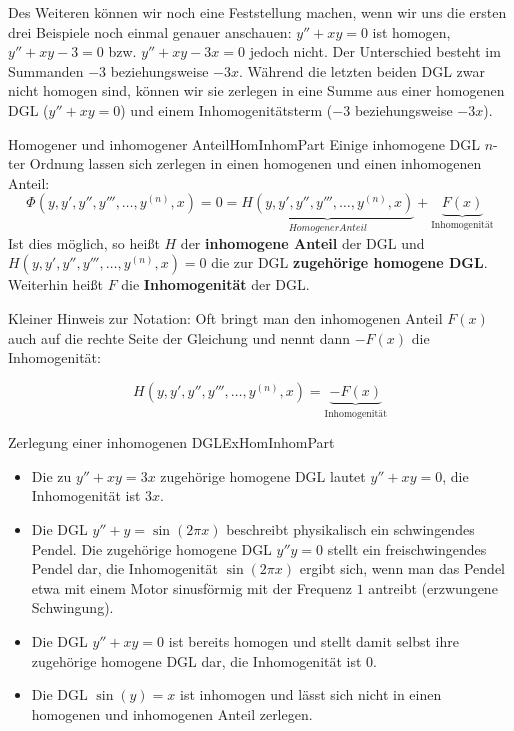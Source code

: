 Des Weiteren können wir noch eine Feststellung machen, wenn wir uns die ersten drei Beispiele noch einmal genauer anschauen: $y''+xy=0$ ist homogen, $y''+xy-3=0$ bzw. $y''+xy-3x=0$ jedoch nicht. Der Unterschied besteht im Summanden $-3$ beziehungsweise $-3x$. Während die letzten beiden DGL zwar nicht homogen sind, können wir sie zerlegen in eine Summe aus einer homogenen DGL ($y''+xy=0$) und einem Inhomogenitätsterm ($-3$ beziehungsweise $-3x$).

\begin{definition}{Homogener und inhomogener Anteil}{HomInhomPart}
    Einige inhomogene DGL $n$-ter Ordnung lassen sich zerlegen in einen homogenen und einen inhomogenen Anteil:
    $$
        \Phi(y,y',y'',y''',\dots,y^{(n)},x) = 0 = \underbrace{H(y,y',y'',y''',\dots,y^{(n)},x)}_{Homogener Anteil} + \underbrace{F(x)}_{\text{Inhomogenität}}
    $$
    Ist dies möglich, so heißt $H$ der \textbf{inhomogene Anteil} der DGL und $H(y,y',y'',y''',\dots,y^{(n)},x) = 0$ die zur DGL \textbf{zugehörige homogene DGL}. Weiterhin heißt $F$ die \textbf{Inhomogenität} der DGL.
\end{definition}

Kleiner Hinweis zur Notation: Oft bringt man den inhomogenen Anteil $F(x)$ auch auf die rechte Seite der Gleichung und nennt dann $-F(x)$ die Inhomogenität:

$$
    H(y,y',y'',y''',\dots,y^{(n)},x) = \underbrace{-F(x)}_{\text{Inhomogenität}}
$$

\begin{example}{Zerlegung einer inhomogenen DGL}{ExHomInhomPart}
    \begin{itemize}
        \item Die zu $y''+xy=3x$ zugehörige homogene DGL lautet $y''+xy=0$, die Inhomogenität ist $3x$.
        \item Die DGL $y''+y = \sin(2 \pi x)$ beschreibt physikalisch ein schwingendes Pendel. Die zugehörige homogene DGL $y''y=0$ stellt ein freischwingendes Pendel dar, die Inhomogenität $\sin(2 \pi x)$ ergibt sich, wenn man das Pendel etwa mit einem Motor sinusförmig mit der Frequenz $1$ antreibt (erzwungene Schwingung).
        \item Die DGL $y''+xy=0$ ist bereits homogen und stellt damit selbst ihre zugehörige homogene DGL dar, die Inhomogenität ist $0$.
        \item Die DGL $\sin(y)=x$ ist inhomogen und lässt sich nicht in einen homogenen und inhomogenen Anteil zerlegen.
    \end{itemize}
\end{example}

